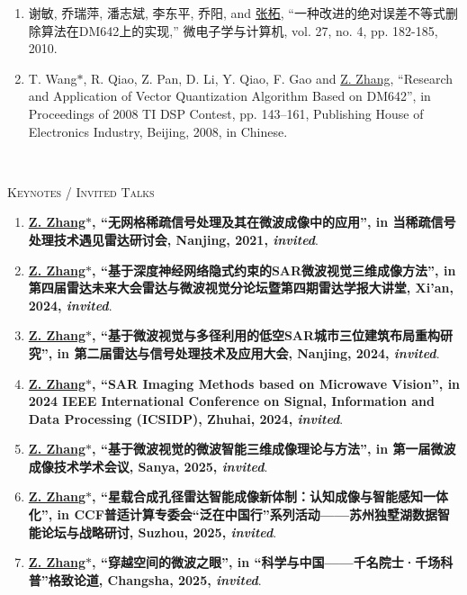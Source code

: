 \documentclass[paper=a4,fontsize=11pt]{scrartcl}
\begin{document}
\begin{enumerate}

\item 谢敏, 乔瑞萍, 潘志斌, 李东平, 乔阳, and \underline{张柘}, ``一种改进的绝对误差不等式删除算法在DM642上的实现,'' 微电子学与计算机, vol. 27, no. 4, pp. 182-185, 2010.

\item T. Wang$\ast$, R. Qiao, Z. Pan, D. Li, Y. Qiao, F. Gao and \underline{Z. Zhang}, ``Research and Application of Vector Quantization Algorithm Based on DM642'', in Proceedings of 2008 TI DSP Contest, pp. 143--161, Publishing House of Electronics Industry, Beijing, 2008, in Chinese. 

~\\

\end{enumerate}

\textsc{Keynotes / Invited Talks}

\begin{enumerate}

\item \textbf{\underline{Z. Zhang$\ast$}, ``无网格稀疏信号处理及其在微波成像中的应用'', in 当稀疏信号处理技术遇见雷达研讨会, Nanjing, 2021, \emph{invited}}.

\item \textbf{\underline{Z. Zhang$\ast$}, ``基于深度神经网络隐式约束的SAR微波视觉三维成像方法'', in 第四届雷达未来大会雷达与微波视觉分论坛暨第四期雷达学报大讲堂, Xi'an, 2024, \emph{invited}}.

\item \textbf{\underline{Z. Zhang$\ast$}, ``基于微波视觉与多径利用的低空SAR城市三位建筑布局重构研究'', in 第二届雷达与信号处理技术及应用大会, Nanjing, 2024, \emph{invited}}.

\item \textbf{\underline{Z. Zhang$\ast$}, ``SAR Imaging Methods based on Microwave Vision'', in 2024 IEEE International Conference on Signal, Information and Data Processing (ICSIDP), Zhuhai, 2024, \emph{invited}}.

\item \textbf{\underline{Z. Zhang$\ast$}, ``基于微波视觉的微波智能三维成像理论与方法'', in 第一届微波成像技术学术会议, Sanya, 2025, \emph{invited}}.

\item \textbf{\underline{Z. Zhang$\ast$}, ``星载合成孔径雷达智能成像新体制：认知成像与智能感知一体化'', in CCF普适计算专委会``泛在中国行''系列活动——苏州独墅湖数据智能论坛与战略研讨, Suzhou, 2025, \emph{invited}}.

\item \textbf{\underline{Z. Zhang$\ast$}, ``穿越空间的微波之眼'', in ``科学与中国——千名院士·千场科普''格致论道, Changsha, 2025, \emph{invited}}.

\end{enumerate}
\end{document}
